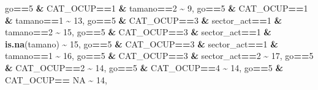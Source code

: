 \documentclass[
]{article}
\newenvironment{Shaded}{\begin{snugshade}}{\end{snugshade}}
\newcommand{\ConstantTok}[1]{\textcolor[rgb]{0.56,0.35,0.01}{#1}}
\newcommand{\DecValTok}[1]{\textcolor[rgb]{0.00,0.00,0.81}{#1}}
\newcommand{\FunctionTok}[1]{\textcolor[rgb]{0.13,0.29,0.53}{\textbf{#1}}}
\newcommand{\NormalTok}[1]{#1}
\newcommand{\SpecialCharTok}[1]{\textcolor[rgb]{0.81,0.36,0.00}{\textbf{#1}}}
\begin{document}
\begin{Shaded}
\begin{Highlighting}[]
\NormalTok{                               go}\SpecialCharTok{==}\DecValTok{5} \SpecialCharTok{\&}\NormalTok{ CAT\_OCUP}\SpecialCharTok{==}\DecValTok{1} \SpecialCharTok{\&}\NormalTok{ tamano}\SpecialCharTok{==}\DecValTok{2} \SpecialCharTok{\textasciitilde{}} \DecValTok{9}\NormalTok{,}
\NormalTok{                               go}\SpecialCharTok{==}\DecValTok{5} \SpecialCharTok{\&}\NormalTok{ CAT\_OCUP}\SpecialCharTok{==}\DecValTok{1} \SpecialCharTok{\&}\NormalTok{ tamano}\SpecialCharTok{==}\DecValTok{1} \SpecialCharTok{\textasciitilde{}} \DecValTok{13}\NormalTok{,}
\NormalTok{                               go}\SpecialCharTok{==}\DecValTok{5} \SpecialCharTok{\&}\NormalTok{ CAT\_OCUP}\SpecialCharTok{==}\DecValTok{3} \SpecialCharTok{\&}\NormalTok{ sector\_act}\SpecialCharTok{==}\DecValTok{1} \SpecialCharTok{\&}\NormalTok{ tamano}\SpecialCharTok{==}\DecValTok{2} \SpecialCharTok{\textasciitilde{}} \DecValTok{15}\NormalTok{,}
\NormalTok{                               go}\SpecialCharTok{==}\DecValTok{5} \SpecialCharTok{\&}\NormalTok{ CAT\_OCUP}\SpecialCharTok{==}\DecValTok{3} \SpecialCharTok{\&}\NormalTok{ sector\_act}\SpecialCharTok{==}\DecValTok{1} \SpecialCharTok{\&} \FunctionTok{is.na}\NormalTok{(tamano) }\SpecialCharTok{\textasciitilde{}} \DecValTok{15}\NormalTok{,}
\NormalTok{                               go}\SpecialCharTok{==}\DecValTok{5} \SpecialCharTok{\&}\NormalTok{ CAT\_OCUP}\SpecialCharTok{==}\DecValTok{3} \SpecialCharTok{\&}\NormalTok{ sector\_act}\SpecialCharTok{==}\DecValTok{1} \SpecialCharTok{\&}\NormalTok{ tamano}\SpecialCharTok{==}\DecValTok{1} \SpecialCharTok{\textasciitilde{}} \DecValTok{16}\NormalTok{,}
\NormalTok{                               go}\SpecialCharTok{==}\DecValTok{5} \SpecialCharTok{\&}\NormalTok{ CAT\_OCUP}\SpecialCharTok{==}\DecValTok{3} \SpecialCharTok{\&}\NormalTok{ sector\_act}\SpecialCharTok{==}\DecValTok{2}  \SpecialCharTok{\textasciitilde{}} \DecValTok{17}\NormalTok{,}
\NormalTok{                               go}\SpecialCharTok{==}\DecValTok{5} \SpecialCharTok{\&}\NormalTok{ CAT\_OCUP}\SpecialCharTok{==}\DecValTok{2}  \SpecialCharTok{\textasciitilde{}} \DecValTok{14}\NormalTok{,}
\NormalTok{                               go}\SpecialCharTok{==}\DecValTok{5} \SpecialCharTok{\&}\NormalTok{ CAT\_OCUP}\SpecialCharTok{==}\DecValTok{4} \SpecialCharTok{\textasciitilde{}} \DecValTok{14}\NormalTok{,}
\NormalTok{                               go}\SpecialCharTok{==}\DecValTok{5} \SpecialCharTok{\&}\NormalTok{ CAT\_OCUP}\SpecialCharTok{==} \ConstantTok{NA} \SpecialCharTok{\textasciitilde{}} \DecValTok{14}\NormalTok{,}
         

\end{Highlighting}
\end{Shaded}
\end{document}

